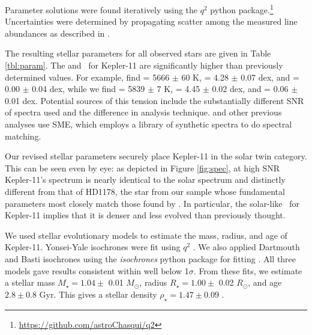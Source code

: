 \documentclass[oneside]{emulateapj}
\begin{document}
Parameter solutions were found iteratively using the $q^2$ python package.\footnote{\url{https://github.com/astroChasqui/q2}} Uncertainties were determined by propagating scatter among the measured line abundances as described in \citet{Epstein2010, Bensby2014}.

The resulting stellar parameters for all observed stars are given in Table \ref{tbl:param}. The \teff and \logg\ for Kepler-11 are significantly higher than previously determined values. For example, \citet{Lissauer2013} find \teff = 5666 $\pm$ 60 K, \logg = 4.28 $\pm$ 0.07 dex, and \feh = 0.00 $\pm$ 0.04 dex, while we find \teff = 5839 $\pm$ 7 K, \logg = 4.45 $\pm$ 0.02 dex, and \feh = 0.06 $\pm$ 0.01 dex. Potential sources of this tension include the substantially different SNR of spectra used and the difference in analysis technique. \citet{Lissauer2013} and other previous analyses use SME, which employs a library of synthetic spectra to do spectral matching. 

Our revised stellar parameters securely place Kepler-11 in the solar twin category. This can be seen even by eye: as depicted in Figure \ref{fig:spec}, at high SNR Kepler-11's spectrum is nearly identical to the solar spectrum and distinctly different from that of HD1178, the star from our sample whose fundamental parameters most closely match those found by \citet{Lissauer2013}. In particular, the solar-like \logg\ for Kepler-11 implies that it is denser and less evolved than previously thought.

We used stellar evolutionary models to estimate the mass, radius, and age of Kepler-11. Yonsei-Yale isochrones were fit using $q^2$ . We also applied Dartmouth and Basti isochrones using the \textit{isochrones} python package for fitting \citep{Morton2015}. All three models gave results consistent within well below 1$\sigma$. From these fits, we estimate a stellar mass $M_{\star} = 1.04 \pm$ 0.01 $M_{\odot}$, radius $R_{\star} = 1.00 \pm$ 0.02 $R_{\odot}$, and age $2.8 \pm 0.8$ Gyr. This gives a stellar density $\rho_{\star} = 1.47 \pm 0.09$ \gcm.
\end{document}
